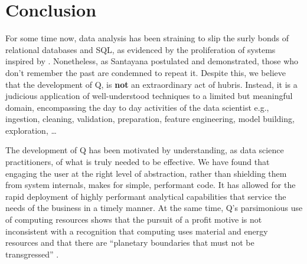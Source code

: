\section{Conclusion}
\label{end}

For some time now, data analysis has been straining to 
slip the surly bonds of relational databases and SQL, as evidenced by the proliferation of systems
inspired by \cite{mapreduce2004}. Nonetheless, as Santayana postulated and \cite{antihadoop2009} demonstrated,
those who don't remember the past are condemned to repeat it.
Despite this, we believe that the development of Q, is {\bf not} an
extraordinary act of hubris. Instead, it is a judicious application of
well-understood techniques to a limited but meaningful domain, encompassing
the day to day activities of the data scientist e.g., ingestion, cleaning,
validation, preparation, feature engineering, model building, exploration,
\ldots

The development of Q has been motivated by understanding, as data 
science practitioners, of what is truly needed to be
effective. We have found that engaging the user at the right level of abstraction, rather than shielding them from
system internals, makes for simple, performant code. It has allowed for the
rapid deployment of highly performant analytical capabilities that 
service the needs of the business in a timely manner. At the same time, Q's
parsimonious use of computing resources shows that the pursuit of a profit
motive is not inconsistent with a recognition that computing uses 
material and energy resources \cite{Schumacher,Limits2018} and that there are 
``planetary boundaries that must not be transgressed'' \cite{Rockstrom2009}.

